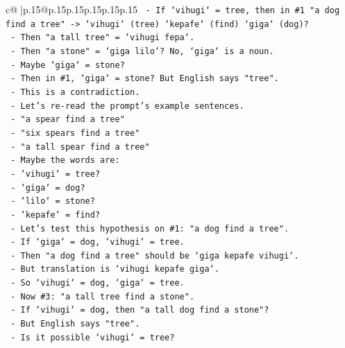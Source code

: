 \documentclass{article}
\begin{document}
{\begin{supertabular}{c@{$\;$}|p{.15\linewidth}@{}p{.15\linewidth}p{.15\linewidth}p{.15\linewidth}p{.15\linewidth}p{.15\linewidth}}
{{{\texttt{                {-}   If `vihugi` = tree, then in \#1 "a dog find a tree" {-}> `vihugi` (tree) `kepafe` (find) `giga` (dog)?} \\
\texttt{                {-}   Then "a tall tree" = `vihugi fepa`.} \\
\texttt{                {-}   Then "a stone" = `giga lilo`? No, `giga` is a noun.} \\
\texttt{                {-}   Maybe `giga` = stone?} \\
\texttt{                {-}   Then in \#1, `giga` = stone? But English says "tree".} \\
\texttt{                {-}   This is a contradiction.} \\
\texttt{                {-}   Let's re{-}read the prompt's example sentences.} \\
\texttt{                {-}   "a spear find a tree"} \\
\texttt{                {-}   "six spears find a tree"} \\
\texttt{                {-}   "a tall spear find a tree"} \\
\texttt{                {-}   Maybe the words are:} \\
\texttt{                    {-}   `vihugi` = tree?} \\
\texttt{                    {-}   `giga` = dog?} \\
\texttt{                    {-}   `lilo` = stone?} \\
\texttt{                    {-}   `kepafe` = find?} \\
\texttt{                {-}   Let's test this hypothesis on \#1: "a dog find a tree".} \\
\texttt{                    {-}   If `giga` = dog, `vihugi` = tree.} \\
\texttt{                    {-}   Then "a dog find a tree" should be `giga kepafe vihugi`.} \\
\texttt{                    {-}   But translation is `vihugi kepafe giga`.} \\
\texttt{                    {-}   So `vihugi` = dog, `giga` = tree.} \\
\texttt{                {-}   Now \#3: "a tall tree find a stone".} \\
\texttt{                    {-}   If `vihugi` = dog, then "a tall dog find a stone"?} \\
\texttt{                    {-}   But English says "tree".} \\
\texttt{                    {-}   Is it possible `vihugi` = tree?} \\
}}}
\end{supertabular}}
\end{document}
